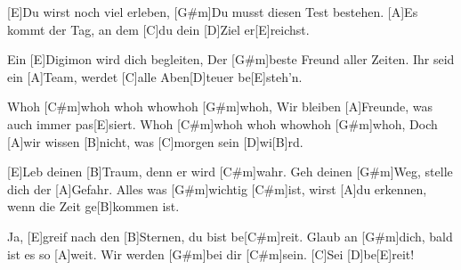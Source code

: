 

\begin{guitar}
	[E]Du wirst noch viel erleben,
	[G#m]Du musst diesen Test bestehen.
	[A]Es kommt der Tag, an dem [C]du dein [D]Ziel er[E]reichst.
	
	Ein [E]Digimon wird dich begleiten,
	Der [G#m]beste Freund aller Zeiten.
	Ihr seid ein [A]Team, werdet [C]alle Aben[D]teuer be[E]steh'n.
	
	Whoh [C#m]whoh whoh whowhoh [G#m]whoh,
	Wir bleiben [A]Freunde, was auch immer pas[E]siert.
	Whoh [C#m]whoh whoh whowhoh [G#m]whoh,
	Doch [A]wir wissen [B]nicht, was [C]morgen sein [D]wi[B]rd.
	
	[E]Leb deinen [B]Traum, denn er wird [C#m]wahr.
	Geh deinen [G#m]Weg, stelle dich der [A]Gefahr.
	Alles was [G#m]wichtig [C#m]ist,
	wirst [A]du erkennen, wenn die Zeit ge[B]kommen ist.
	
	Ja, [E]greif nach den [B]Sternen, du bist be[C#m]reit.
	Glaub an [G#m]dich, bald ist es so [A]weit.
	Wir werden [G#m]bei dir [C#m]sein.
	[C]Sei [D]be[E]reit!
\end{guitar}